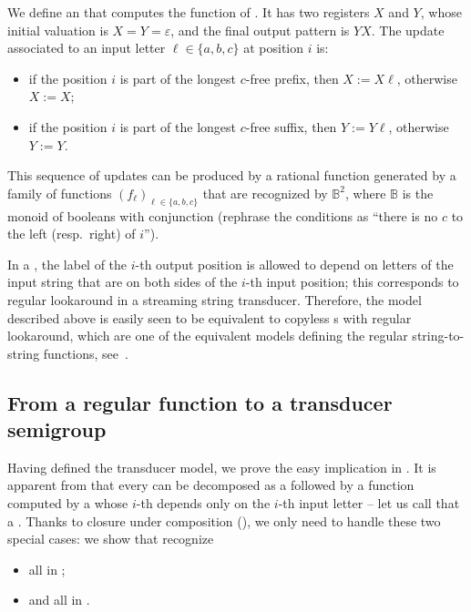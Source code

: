 \begin{example}
  We define an \sst{} that computes the function of . It has two registers $X$ and $Y$, whose initial valuation is $X=Y=\varepsilon$, and the final output pattern is $YX$. The update associated to an input letter $\ell\in\{a,b,c\}$ at position $i$ is:
  \begin{itemize}
    \item if the position $i$ is part of the longest $c$-free prefix, then $X := X\ell$, otherwise $X:=X$;
    \item if the position $i$ is part of the longest $c$-free suffix, then $Y := Y\ell$, otherwise $Y:=Y$.
  \end{itemize}
  This sequence of updates can be produced by a rational function generated by a family of functions $(f_\ell)_{\ell\in\{a,b,c\}}$ that are recognized by $\mathbb{B}^2$, where $\mathbb{B}$ is the monoid of booleans with conjunction (rephrase the conditions as \enquote{there is no $c$ to the left (resp.~right) of $i$}).
\end{example}

In a , the label of the $i$-th output position is allowed to depend on letters of the input string that are on both sides of the $i$-th input position; this corresponds to regular lookaround in a streaming string transducer. Therefore, the model described above is easily seen to be equivalent to copyless \sst{}s with regular lookaround, which are one of the equivalent models defining the regular string-to-string functions, see~\cite[Section~IV.C]{AlurFT12}.

\subsection{From a regular function to a transducer semigroup}
\label{sec:easy}

\AP Having defined the transducer model, we prove the easy implication in
. It is apparent from  that every
 can be decomposed as a  followed by a function
computed by a  whose $i$-th  depends
only on the $i$-th input letter -- let us call that a  \sst. Thanks
to closure under composition (), we only need to handle
these two special cases: we show that   recognize
\begin{itemize}
\item all  in ;
\item and all   in .
\end{itemize}

